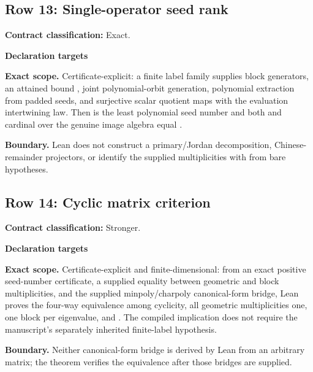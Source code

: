 \subsection{Row 13: Single-operator seed rank}
\label{row:13}
\textbf{Contract classification:} Exact.
\par\smallskip\textbf{Declaration targets}\par
{\small\noindent{}\par}
{\small\noindent{}\par}
\medskip\noindent\textbf{Exact scope.} Certificate-explicit: a finite label family supplies block generators, an attained bound , joint polynomial-orbit generation, polynomial extraction from padded seeds, and surjective scalar quotient maps with the evaluation intertwining law. Then  is the least polynomial seed number and both  and cardinal  over the genuine image algebra  equal .
\par\smallskip\noindent\textbf{Boundary.} Lean does not construct a primary/Jordan decomposition, Chinese-remainder projectors, or identify the supplied multiplicities with  from bare hypotheses.
\medskip
\subsection{Row 14: Cyclic matrix criterion}
\label{row:14}
\textbf{Contract classification:} Stronger.
\par\smallskip\textbf{Declaration targets}\par
{\small\noindent{}\par}
{\small\noindent{}\par}
\medskip\noindent\textbf{Exact scope.} Certificate-explicit and finite-dimensional: from an exact positive seed-number certificate, a supplied equality between geometric and block multiplicities, and the supplied minpoly/charpoly canonical-form bridge, Lean proves the four-way equivalence among cyclicity, all geometric multiplicities one, one block per eigenvalue, and . The compiled implication does not require the manuscript's separately inherited finite-label hypothesis.
\par\smallskip\noindent\textbf{Boundary.} Neither canonical-form bridge is derived by Lean from an arbitrary matrix; the theorem verifies the equivalence after those bridges are supplied.
\medskip
